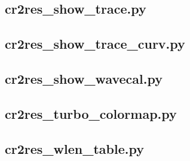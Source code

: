 \subsection{cr2res\_show\_trace.py}
\subsection{cr2res\_show\_trace\_curv.py}
\subsection{cr2res\_show\_wavecal.py}
\subsection{cr2res\_turbo\_colormap.py}
\subsection{cr2res\_wlen\_table.py}

